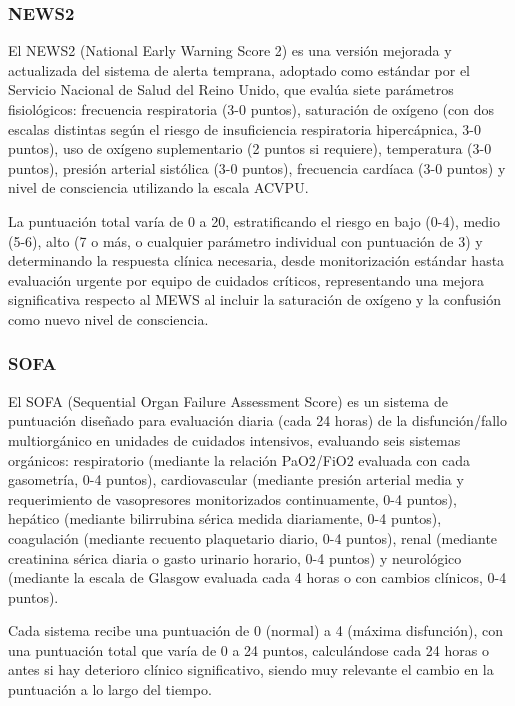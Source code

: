 \subsubsection{NEWS2}
El NEWS2 (National Early Warning Score 2) es una versión mejorada y actualizada del sistema de alerta temprana, adoptado como estándar por el Servicio Nacional de Salud del Reino Unido, 
que evalúa siete parámetros fisiológicos: frecuencia respiratoria (3-0 puntos), saturación de oxígeno (con dos escalas distintas según el riesgo de insuficiencia respiratoria hipercápnica, 3-0 puntos), 
uso de oxígeno suplementario (2 puntos si requiere), temperatura (3-0 puntos), presión arterial sistólica (3-0 puntos), frecuencia cardíaca (3-0 puntos) 
y nivel de consciencia utilizando la escala ACVPU.\newline

La puntuación total varía de 0 a 20, estratificando el riesgo en bajo (0-4), medio (5-6), alto (7 o más, o cualquier parámetro individual con puntuación de 3) y determinando la respuesta clínica necesaria, 
desde monitorización estándar hasta evaluación urgente por equipo de cuidados críticos, representando una mejora significativa respecto al MEWS al incluir la saturación de oxígeno 
y la confusión como nuevo nivel de consciencia.

\newpage

\subsubsection{SOFA}
El SOFA (Sequential Organ Failure Assessment Score) es un sistema de puntuación diseñado para evaluación diaria (cada 24 horas) de la disfunción/fallo multiorgánico en unidades de cuidados intensivos, 
evaluando seis sistemas orgánicos: respiratorio (mediante la relación PaO2/FiO2 evaluada con cada gasometría, 0-4 puntos), 
cardiovascular (mediante presión arterial media y requerimiento de vasopresores monitorizados continuamente, 0-4 puntos), hepático (mediante bilirrubina sérica medida diariamente, 0-4 puntos), 
coagulación (mediante recuento plaquetario diario, 0-4 puntos), renal (mediante creatinina sérica diaria o gasto urinario horario, 0-4 puntos) 
y neurológico (mediante la escala de Glasgow evaluada cada 4 horas o con cambios clínicos, 0-4 puntos).\newline

Cada sistema recibe una puntuación de 0 (normal) a 4 (máxima disfunción), con una puntuación total que varía de 0 a 24 puntos, calculándose cada 24 horas o antes si hay deterioro clínico significativo, 
siendo muy relevante el cambio en la puntuación a lo largo del tiempo.

